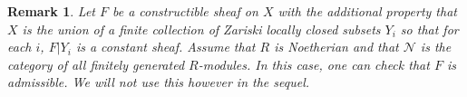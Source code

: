 \documentclass[10pt,twoside]{article}
\newtheorem{remark}[thm]{Remark}
\begin{document}
\renewcommand{\thethm}{3.7}
\begin{remark}
Let $F$ be a constructible sheaf on $X$ with the additional property
that $X$ is the union of a finite collection of Zariski locally closed 
subsets $Y_i$ so that for each $i$, $F|Y_i$ is a \emph{constant 
sheaf}. Assume that $R$ is Noetherian and that $\mathcal{N}$ is
the category of all finitely generated $R$-modules. In this case,
one can check that $F$ is admissible. We will not use this however
in the sequel. 
\end{remark} 

\renewcommand{\thethm}{3.8}

\end{document}

